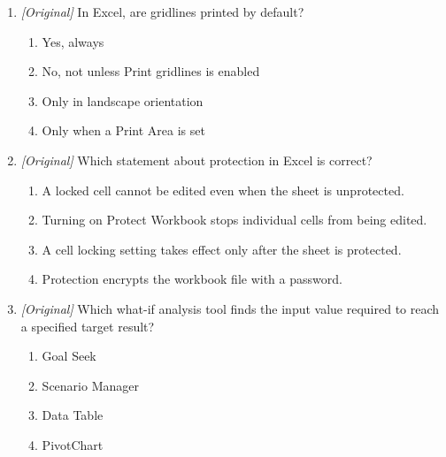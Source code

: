 \begin{enumerate}[label=\textbf{Q\arabic*.}, leftmargin=*]
\begin{enumerate}[label=\Alph*.]
  \end{enumerate}
\item \textit{[Original]} In Excel, are gridlines printed by default?
  \begin{enumerate}[label=\Alph*.]
    \item Yes, always
    \item No, not unless Print gridlines is enabled
    \item Only in landscape orientation
    \item Only when a Print Area is set
  \end{enumerate}
\item \textit{[Original]} Which statement about protection in Excel is correct?
  \begin{enumerate}[label=\Alph*.]
    \item A locked cell cannot be edited even when the sheet is unprotected.
    \item Turning on Protect Workbook stops individual cells from being edited.
    \item A cell locking setting takes effect only after the sheet is
      protected.
    \item Protection encrypts the workbook file with a password.
  \end{enumerate}
\item \textit{[Original]} Which what-if analysis tool finds the input value
  required to reach a specified target result?
  \begin{enumerate}[label=\Alph*.]
    \item Goal Seek
    \item Scenario Manager
    \item Data Table
    \item PivotChart
  \end{enumerate}


\end{enumerate}
